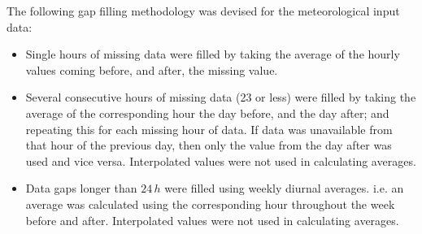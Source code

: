 \documentclass[bg, manuscript]{copernicus}
\begin{document}
The following gap filling methodology was devised for the meteorological input data:
\begin{itemize}
\item Single hours of missing data were filled by taking the average of the hourly values coming before, and after, the missing value.
\item Several consecutive hours of missing data (23 or less) were filled by taking the average of the corresponding hour the day before, and the day after; and repeating this for each missing hour of data. If data was unavailable from that hour of the previous day, then only the value from the day after was used and vice versa. Interpolated values were not used in calculating averages.
\item Data gaps longer than $24\,\unit{h}$ were filled using weekly diurnal averages. i.e. an average was calculated using the corresponding hour throughout the week before and after. Interpolated values were not used in calculating averages.
\end{itemize}
\end{document}
